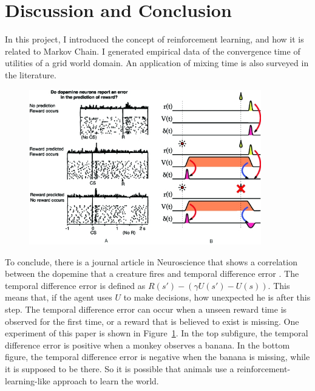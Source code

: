 \documentclass[10pt]{article}
\begin{document}
\section{Discussion and Conclusion}

In this project, I introduced the concept of reinforcement learning, and how it
is related to Markov Chain. I generated empirical data of the convergence time
of utilities of a grid world domain. An application of mixing time is also
surveyed in the literature.

\begin{figure}[h!]
\includegraphics[width=0.9\textwidth]{dopamine.jpg}
\label{fig:nat}
\end{figure}

To conclude, there is a journal article in Neuroscience that shows a correlation
between the dopemine that a creature fires and temporal difference error
\cite{tanaka2004prediction}.  The temporal difference error is defined as $R(s')
- (\gamma U(s') - U(s))$. This means that, if the agent uses $U$ to make
decisions, how unexpected he is after this step. The temporal difference error
can occur when a unseen reward time is observed for the first time, or a reward
that is believed to exist is missing. One experiment of this paper is shown in
Figure~\ref{fig:nat}. In the top subfigure, the temporal difference error is
positive when a monkey observes a banana. In the bottom figure, the temporal
difference error is negative when the banana is missing, while it is supposed to
be there. So it is possible that animals use a reinforcement-learning-like
approach to learn the world.




\end{document}

